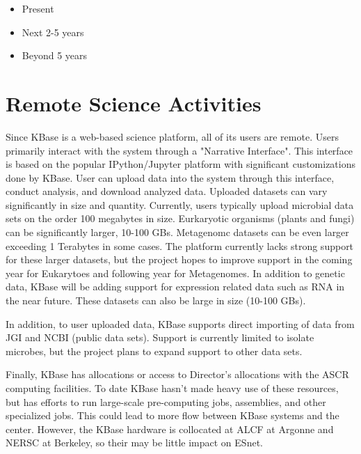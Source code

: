 \documentclass[10pt,a4paper]{report}
\begin{document}
\begin{itemize}
\item Present
\item Next 2-5 years
\item Beyond 5 years
\end{itemize}

\section{Remote Science Activities}

Since KBase is a web-based science platform, all of its users are remote.  Users primarily interact with the system through a "Narrative Interface".  This interface is based on the popular IPython/Jupyter platform with significant customizations done by KBase.  User can upload  data into the system through this interface, conduct analysis, and download analyzed data.  Uploaded datasets can vary significantly in size and quantity.  Currently, users typically upload microbial data sets on the order 100 megabytes in size.  Eurkaryotic organisms (plants and fungi) can be significantly larger, 10-100 GBs.  Metagenomc datasets can be even larger exceeding 1 Terabytes in some cases.  The platform currently lacks strong support for these larger datasets, but the project hopes to improve support in the coming year for Eukarytoes and following year for Metagenomes.  In addition to genetic data, KBase will be adding support for expression related data such as RNA in the near future.  These datasets can also be large in size (10-100 GBs).

In addition, to user uploaded data, KBase supports direct importing of data from JGI and NCBI (public data sets).  Support is currently limited to isolate microbes, but the project plans to expand support to other data sets.

Finally, KBase has allocations or access to Director's allocations with the ASCR computing facilities.  To date  KBase hasn't made heavy use of these resources, but has efforts to run large-scale pre-computing jobs, assemblies, and other specialized jobs.  This could lead to more flow between KBase systems and the center.  However, the KBase hardware is collocated at ALCF at Argonne and NERSC at Berkeley, so their may be little impact on ESnet.
\end{document}
